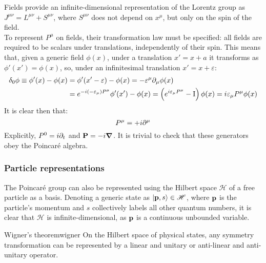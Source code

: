 Fields provide an infinite-dimensional representation of the Lorentz group as $ J^{\mu \nu} = L^{\mu \nu} + S^{\mu \nu} $, where $ S^{\mu \nu} $ does not depend on $ x^\mu $, but only on the spin of the field.\\
To represent $ P^\mu $ on fields, their transformation law must be specified: all fields are required to be scalars under translations, independently of their spin. This means that, given a generic field $ \phi(x) $, under a translation $ x' = x + a $ it transforms as $ \phi'(x') = \phi(x) $, so, under an infinitesimal translation $ x' = x + \varepsilon $:
\begin{equation*}
  \begin{split}
    \delta_0 \phi \equiv \phi'(x) - \phi(x) &= \phi'(x' - \varepsilon) - \phi(x) = - \varepsilon^\mu \partial_\mu \phi(x) \\
                                            &= e^{-i (-\varepsilon_\mu) P^\mu} \phi'(x') - \phi(x) = \left( e^{i \varepsilon_\mu P^\mu} - \mathrm{I} \right) \phi(x) = i \varepsilon_\mu P^\mu \phi(x)
  \end{split}
\end{equation*}
It is clear then that:
\begin{equation}
  P^\mu = +i \partial^\mu
\end{equation}
Explicitly, $ P^0 = i \partial_t $ and $ \mathbf{P} = - i \boldsymbol{\nabla} $. It is trivial to check that these generators obey the Poincaré algebra.

\subsubsection{Particle representations}

The Poincaré group can also be represented using the Hilbert space $ \mathscr{H} $ of a free particle as a basis. Denoting a generic state as $ \ket{\mathbf{p},s} \in \mathscr{H} $, where $ \mathbf{p} $ is the particle's momentum and $ s $ collectively labels all other quantum numbers, it is clear that $ \mathscr{H} $ is infinite-dimensional, as $ \mathbf{p} $ is a continuous unbounded variable.

\begin{theorem}{Wigner's theorem}{wigner}
  On the Hilbert space of physical states, any symmetry transformation can be represented by a linear and unitary or anti-linear and anti-unitary operator.
\end{theorem}

